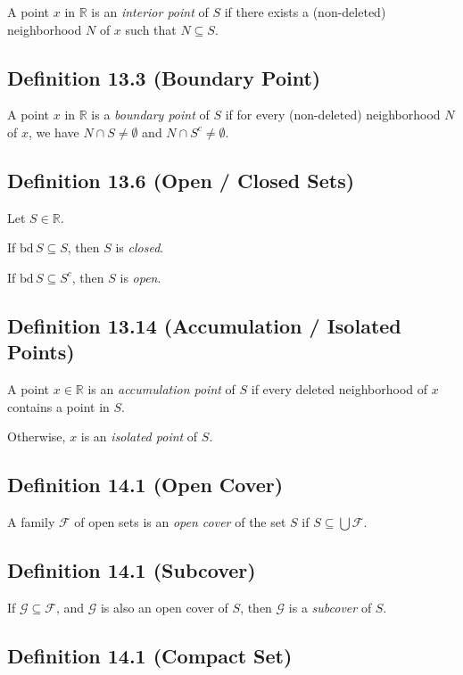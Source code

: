 \documentclass{book}
\begin{document}
A point $x$ in $\mathbb{R}$ is an \emph{interior point} of $S$ if there exists a (non-deleted) neighborhood $N$ of $x$ such that $N \subseteq S$. 

\subsection*{Definition 13.3 (Boundary Point)}

A point $x$ in $\mathbb{R}$ is a \emph{boundary point} of $S$ if for every (non-deleted) neighborhood $N$ of $x$, we have $N \cap S \neq \emptyset$ and $N \cap S^c \neq \emptyset$. 

\subsection*{Definition 13.6 (Open / Closed Sets)}

Let $S \in \mathbb{R}$. 

If $    \text{bd} \,S \subseteq S$, then $S$ is \emph{closed}.

If $\text{bd} \,S \subseteq S^c$, then $S$ is \emph{open}. 

\subsection*{Definition 13.14 (Accumulation / Isolated Points)}

A point $x \in \mathbb{R}$ is an \emph{accumulation point} of $S$ if every deleted neighborhood of $x$ contains a point in $S$. 

Otherwise, $x$ is an \emph{isolated point} of $S$. 

\subsection*{Definition 14.1 (Open Cover)}

A family $\mathcal{F}$ of open sets is an \emph{open cover} of the set $S$ if $S \subseteq \bigcup \mathcal{F}$. 

\subsection*{Definition 14.1 (Subcover)}

If $\mathcal{G} \subseteq \mathcal{F}$, and $\mathcal{G}$ is also an open cover of $S$, then $\mathcal{G}$ is a \emph{subcover} of $S$. 

\subsection*{Definition 14.1 (Compact Set)}
\end{document}
